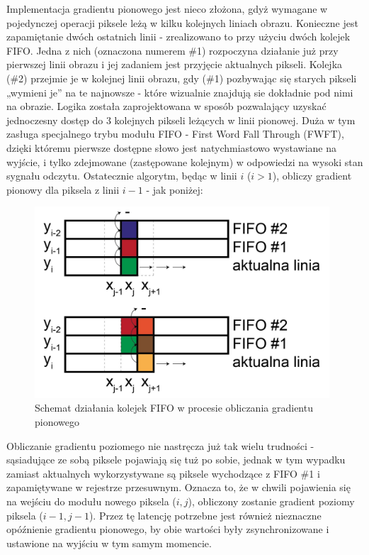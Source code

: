 Implementacja gradientu pionowego jest nieco złożona, gdyż wymagane w pojedynczej operacji piksele leżą w kilku kolejnych liniach obrazu. Konieczne jest zapamiętanie dwóch ostatnich linii - zrealizowano to przy użyciu dwóch kolejek FIFO. Jedna z nich (oznaczona numerem \#1) rozpoczyna działanie już przy pierwszej linii obrazu i jej zadaniem jest przyjęcie aktualnych pikseli. Kolejka (\#2) przejmie je w kolejnej linii obrazu, gdy (\#1) pozbywając się starych pikseli „wymieni je” na te najnowsze - które wizualnie znajdują sie dokładnie pod nimi na obrazie. Logika została zaprojektowana w sposób pozwalający uzyskać jednoczesny dostęp do 3 kolejnych pikseli leżących w linii pionowej. Duża w tym zasługa specjalnego trybu modułu FIFO - First Word Fall Through (FWFT), dzięki któremu pierwsze dostępne słowo jest natychmiastowo wystawiane na wyjście, i tylko zdejmowane (zastępowane kolejnym) w odpowiedzi na wysoki stan sygnału odczytu.
Ostatecznie algorytm, będąc w linii $i$ ($i>1$), obliczy gradient pionowy dla piksela z linii $i-1$ - jak poniżej:
\begin{figure}[h]
	\centering
	\includegraphics[width=11cm]{4_fifo_gradient.jpg}
	\caption{Schemat działania kolejek FIFO w procesie obliczania gradientu pionowego}
	\label{fig:fifo_gradient}
\end{figure}

Obliczanie gradientu poziomego nie nastręcza już tak wielu trudności - sąsiadujące ze sobą piksele pojawiają się tuż po sobie, jednak w tym wypadku zamiast aktualnych wykorzystywane są piksele wychodzące z FIFO \#1 i zapamiętywane w rejestrze przesuwnym. Oznacza to, że w chwili pojawienia się na wejściu do modułu nowego piksela ($i,j$), obliczony zostanie gradient poziomy piksela ($i-1,j-1$). Przez tę latencję potrzebne jest również nieznaczne opóźnienie gradientu pionowego, by obie wartości były zsynchronizowane i ustawione na wyjściu w tym samym momencie.

